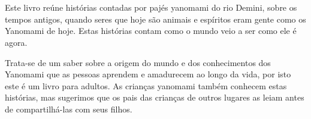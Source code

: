 
\chapter*{}

Este livro reúne histórias contadas por pajés yanomami do rio Demini, sobre os tempos antigos, quando seres que hoje são animais e espíritos eram gente como os Yanomami de hoje. Estas histórias contam como o mundo veio a ser como ele é agora. 

Trata-se de um saber sobre a origem do mundo e dos conhecimentos dos Yanomami que as pessoas aprendem e amadurecem ao longo da vida, por isto este é um livro para adultos. As crianças yanomami também conhecem estas histórias, mas sugerimos que os pais das crianças de outros lugares as leiam antes de compartilhá-las com seus filhos.